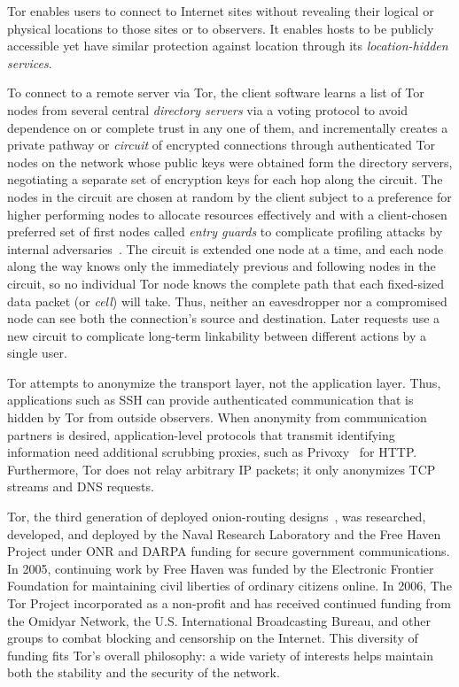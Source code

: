 \documentclass{llncs}
\begin{document}
Tor enables users to connect to Internet sites without revealing their
logical or physical locations to those sites or to observers.  It
enables hosts to be publicly accessible yet have similar protection
against location through its \emph{location-hidden services}.

To connect to a remote server via Tor, the client software learns
a %
list of Tor nodes from several central \emph{directory servers} via a
voting protocol to avoid dependence on or complete trust in any one of
them, and incrementally creates a private pathway or \emph{circuit} of
encrypted connections through authenticated Tor nodes on the network
whose public keys were obtained form the directory servers,
negotiating a separate set of encryption keys for each hop along the
circuit. The nodes in the circuit are chosen at random by the client
subject to a preference for higher performing nodes to allocate
resources effectively and with a client-chosen preferred set of first
nodes called \emph{entry guards} to complicate profiling attacks by
internal adversaries~\cite{hs-attack}.
The circuit is extended one node at a time, and each node
along the way knows only the immediately previous and following nodes
in the circuit, so no individual Tor node knows the complete path that
each fixed-sized data packet (or \emph{cell}) will take.  Thus,
neither an eavesdropper nor a compromised node can see both the
connection's source and destination.  Later requests use a new
circuit to complicate long-term linkability between different actions
by a single user.

Tor attempts to anonymize the transport layer, not the application
layer.  Thus, applications such as SSH can provide
authenticated communication that is hidden by Tor from outside observers.
When anonymity from communication partners is desired,
application-level protocols that transmit identifying
information need additional scrubbing proxies, such as
Privoxy~\cite{privoxy} for HTTP\@.  Furthermore, Tor does not relay
arbitrary IP packets; it only anonymizes TCP streams and DNS requests.

Tor, the third generation of deployed onion-routing
designs~\cite{or-ih96,or-jsac98,tor-design}, was researched, developed,
and deployed by the Naval Research Laboratory and the Free Haven
Project under ONR and DARPA funding for secure government
communications.  In 2005, continuing work by Free Haven was funded by
the Electronic Frontier Foundation for maintaining civil liberties of
ordinary citizens online. In 2006, The Tor Project incorporated as a
non-profit and has received continued funding from the Omidyar Network,
the U.S. International Broadcasting Bureau, and other groups to combat
blocking and censorship on the Internet. This diversity of funding fits
Tor's overall philosophy: a wide variety of interests helps maintain
both the stability and the security of the network.
\end{document}
